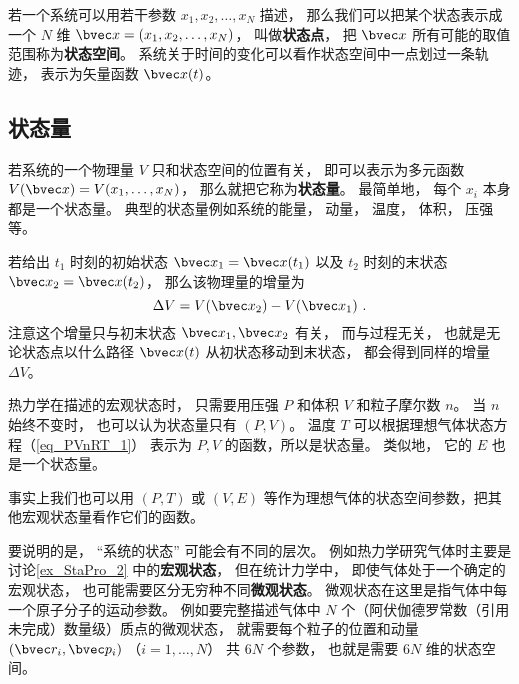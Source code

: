 

若一个系统可以用若干参数 $x_1, x_2,  \dots, x_N$ 描述， 那么我们可以把某个状态表示成一个 $N$ 维 $\bvec x = (x_1, x_2, \dots, x_N)$， 叫做\textbf{状态点}， 把 $\bvec x$ 所有可能的取值范围称为\textbf{状态空间}。 系统关于时间的变化可以看作状态空间中一点划过一条轨迹， 表示为矢量函数 $\bvec x(t)$。

\subsection{状态量}
若系统的一个物理量 $V$ 只和状态空间的位置有关， 即可以表示为多元函数 $V(\bvec x) = V(x_1, \dots, x_N)$， 那么就把它称为\textbf{状态量}。 最简单地， 每个 $x_i$ 本身都是一个状态量。 典型的状态量例如系统的能量， 动量， 温度， 体积， 压强等。

若给出 $t_1$ 时刻的初始状态 $\bvec x_1 = \bvec x(t_1)$ 以及 $t_2$ 时刻的末状态 $\bvec x_2 = \bvec x(t_2)$， 那么该物理量的增量为
\begin{equation}
\Delta V = V(\bvec x_2) - V(\bvec x_1)~.
\end{equation}
注意这个增量只与初末状态 $\bvec x_1,\bvec x_2$ 有关， 而与过程无关， 也就是无论状态点以什么路径 $\bvec x(t)$ 从初状态移动到末状态， 都会得到同样的增量 $\Delta V$。

\begin{example}{}\label{ex_StaPro_2}
热力学在描述的宏观状态时， 只需要用压强 $P$ 和体积 $V$ 和粒子摩尔数 $n$。 当 $n$ 始终不变时， 也可以认为状态量只有 $(P,V)$。 温度 $T$ 可以根据理想气体状态方程（\autoref{eq_PVnRT_1}） 表示为 $P,V$ 的函数，所以是状态量。 类似地， 它的 $E$ 也是一个状态量。

事实上我们也可以用 $(P,T)$ 或 $(V,E)$ 等作为理想气体的状态空间参数，把其他宏观状态量看作它们的函数。
\end{example}

要说明的是， “系统的状态” 可能会有不同的层次。 例如热力学研究气体时主要是讨论\autoref{ex_StaPro_2} 中的\textbf{宏观状态}， 但在统计力学中， 即使气体处于一个确定的宏观状态， 也可能需要区分无穷种不同\textbf{微观状态}。 微观状态在这里是指气体中每一个原子分子的运动参数。 例如要完整描述气体中 $N$ 个（阿伏伽德罗常数（引用未完成）数量级）质点的微观状态， 就需要每个粒子的位置和动量 $(\bvec r_i, \bvec p_i)$ （$i=1,\dots,N$） 共 $6N$ 个参数， 也就是需要 $6N$ 维的状态空间。


